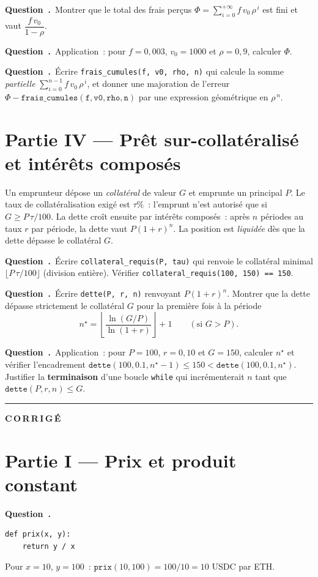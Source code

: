 \documentclass[11pt,a4paper]{article}
\newcounter{qcnt}
\newcommand{\Q}{\medskip\par\stepcounter{qcnt}\noindent\textbf{Question~\theqcnt.}~}
\newcommand{\code}[1]{\lstinline!#1!}
\begin{document}
\Q Montrer que le total des frais perçus $\displaystyle \Phi = \sum_{i=0}^{+\infty} f\,v_0\,
\rho^{\,i}$ est fini et vaut $\dfrac{f\,v_0}{1-\rho}$.

\Q Application~: pour $f = 0{,}003$, $v_0 = 1000$ et $\rho = 0{,}9$, calculer $\Phi$.

\Q Écrire \code{frais_cumules(f, v0, rho, n)} qui calcule la somme \emph{partielle}
$\sum_{i=0}^{n-1} f\,v_0\,\rho^{\,i}$, et donner une majoration de l'erreur
$\Phi - \mathtt{frais\_cumules(f, v0, rho, n)}$ par une expression géométrique en $\rho^{\,n}$.

\section*{Partie IV --- Prêt sur-collatéralisé et intérêts composés}

Un emprunteur dépose un \emph{collatéral} de valeur $G$ et emprunte un principal $P$. Le taux de
collatéralisation exigé est $\tau\%$~: l'emprunt n'est autorisé que si $G \ge P\,\tau/100$. La dette
croît ensuite par intérêts composés~: après $n$ périodes au taux $r$ par période, la dette vaut
$P(1+r)^n$. La position est \emph{liquidée} dès que la dette dépasse le collatéral $G$.

\Q Écrire \code{collateral_requis(P, tau)} qui renvoie le collatéral minimal $\lfloor P\,\tau/100
\rfloor$ (division entière). Vérifier \code{collateral_requis(100, 150) == 150}.

\Q Écrire \code{dette(P, r, n)} renvoyant $P(1+r)^n$. Montrer que la dette dépasse strictement le
collatéral $G$ pour la première fois à la période
$$n^{\star} = \left\lfloor \frac{\ln(G/P)}{\ln(1+r)} \right\rfloor + 1
\qquad (\text{si } G > P).$$

\Q Application~: pour $P = 100$, $r = 0{,}10$ et $G = 150$, calculer $n^{\star}$ et vérifier
l'encadrement $\mathtt{dette}(100, 0.1, n^{\star}-1) \le 150 < \mathtt{dette}(100, 0.1, n^{\star})$.
Justifier la \textbf{terminaison} d'une boucle \code{while} qui incrémenterait $n$ tant que
$\mathtt{dette}(P, r, n) \le G$.

\newpage
\setcounter{qcnt}{0}
\bigskip
\hrule
\bigskip
{\Large\bfseries C\,O\,R\,R\,I\,G\,É}
\medskip

\section*{Partie I --- Prix et produit constant}

\Q
\begin{lstlisting}
def prix(x, y):
    return y / x
\end{lstlisting}
Pour $x=10$, $y=100$~: $\mathtt{prix}(10,100) = 100/10 = 10$ USDC par ETH.
\end{document}
